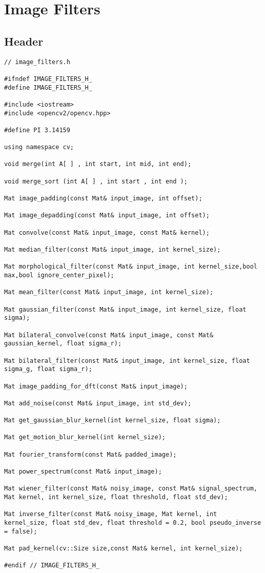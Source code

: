 \pagebreak
\section{Image Filters}

\subsection{Header}
\begin{lstlisting}
// image_filters.h

#ifndef IMAGE_FILTERS_H_
#define IMAGE_FILTERS_H_

#include <iostream>
#include <opencv2/opencv.hpp>

#define PI 3.14159

using namespace cv;

void merge(int A[ ] , int start, int mid, int end);

void merge_sort (int A[ ] , int start , int end );

Mat image_padding(const Mat& input_image, int offset);

Mat image_depadding(const Mat& input_image, int offset);

Mat convolve(const Mat& input_image, const Mat& kernel);

Mat median_filter(const Mat& input_image, int kernel_size);

Mat morphological_filter(const Mat& input_image, int kernel_size,bool max,bool ignore_center_pixel);

Mat mean_filter(const Mat& input_image, int kernel_size);

Mat gaussian_filter(const Mat& input_image, int kernel_size, float sigma);

Mat bilateral_convolve(const Mat& input_image, const Mat& gaussian_kernel, float sigma_r);

Mat bilateral_filter(const Mat& input_image, int kernel_size, float sigma_g, float sigma_r);

Mat image_padding_for_dft(const Mat& input_image);

Mat add_noise(const Mat& input_image, int std_dev);

Mat get_gaussian_blur_kernel(int kernel_size, float sigma);

Mat get_motion_blur_kernel(int kernel_size);

Mat fourier_transform(const Mat& padded_image);

Mat power_spectrum(const Mat& input_image);

Mat wiener_filter(const Mat& noisy_image, const Mat& signal_spectrum, Mat kernel, int kernel_size, float threshold, float std_dev);

Mat inverse_filter(const Mat& noisy_image, Mat kernel, int kernel_size, float std_dev, float threshold = 0.2, bool pseudo_inverse = false);

Mat pad_kernel(cv::Size size,const Mat& kernel, int kernel_size);

#endif // IMAGE_FILTERS_H_

\end{lstlisting}

